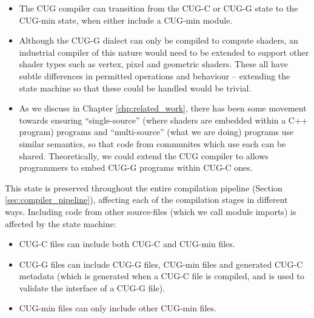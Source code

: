 \documentclass[a4paper,12pt,twoside,openright]{report}
\begin{document}
\begin{itemize}

    \item The CUG compiler can transition from the CUG-C or CUG-G state to the
    CUG-min state, when either include a CUG-min module.

    \item Although the CUG-G dialect can only be compiled to compute shaders,
    an industrial compiler of this nature would need to be extended to support
    other shader types such as vertex, pixel and geometric shaders. These all
    have subtle differences in permitted operations and behaviour -- extending
    the state machine so that these could be handled would be trivial.

    \item As we discuss in Chapter \ref{chp:related_work}, there has been some
    movement towards ensuring ``single-source'' (where shaders are embedded
    within a C++ program) programs and ``multi-source'' (what we are doing)
    programs use similar semantics, so that code from communites which use each
    can be shared. Theoretically, we could extend the CUG compiler to allows
    programmers to embed CUG-G programs within CUG-C ones.

\end{itemize}

This state is preserved throughout the entire compilation pipeline (Section
\ref{sec:compiler_pipeline}), affecting each of the compilation stages in
different ways. Including code from other source-files (which we call module
imports) is affected by the state machine:

\begin{itemize}

    \item CUG-C files can include both CUG-C and CUG-min files.

    \item CUG-G files can include CUG-G files, CUG-min files and generated
    CUG-C metadata (which is generated when a CUG-C file is compiled, and is
    used to validate the interface of a CUG-G file).

    \item CUG-min files can only include other CUG-min files.

\end{itemize}

\end{document}
